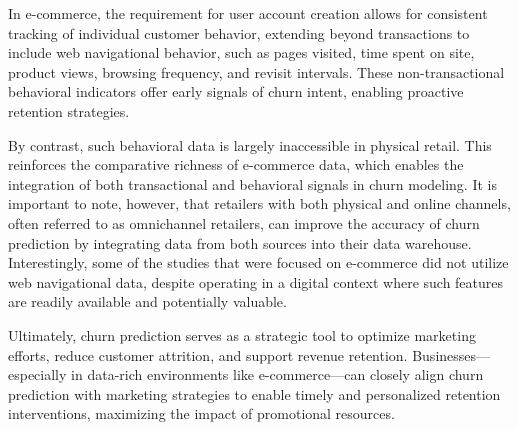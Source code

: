 \documentclass[preprint,12pt]{elsarticle}
\begin{document}
In e-commerce, the requirement for user account creation allows for consistent tracking of individual customer behavior, extending beyond transactions to include web navigational behavior, such as pages visited, time spent on site, product views, browsing frequency, and revisit intervals. These non-transactional behavioral indicators offer early signals of churn intent, enabling proactive retention strategies.

By contrast, such behavioral data is largely inaccessible in physical retail. This reinforces the comparative richness of e-commerce data, which enables the integration of both transactional and behavioral signals in churn modeling. 
It is important to note, however, that retailers with both physical and online channels, often referred to as omnichannel retailers, can improve the accuracy of churn prediction by integrating data from both sources into their data warehouse. 
Interestingly, some of the studies that were focused on e-commerce did not utilize web navigational data, despite operating in a digital context where such features are readily available and potentially valuable.



Ultimately, churn prediction serves as a strategic tool to optimize marketing efforts, reduce customer attrition, and support revenue retention. Businesses---especially in data-rich environments like e-commerce---can closely align churn prediction with marketing strategies to enable timely and personalized retention interventions, maximizing the impact of promotional resources.
\end{document}
